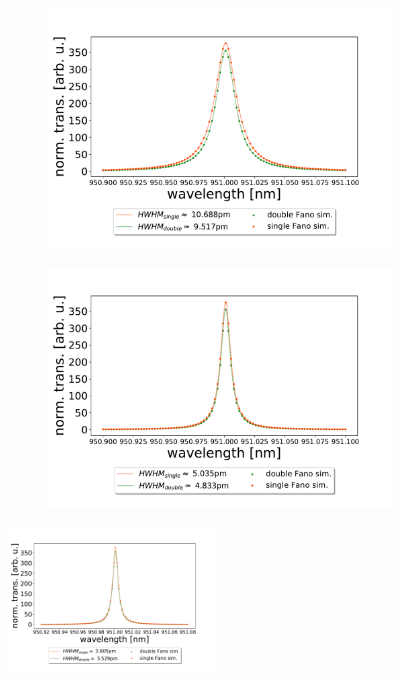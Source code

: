 \begin{figure}[h!]
    \centering
    \begin{subfigure}[b]{0.49\textwidth}
        \includegraphics[width=\textwidth]{figures/sim_single_vs_double_300um.pdf}
        \caption{}
        \label{fig:single_vs_double_simulation_300um}
    \end{subfigure}
    \begin{subfigure}[b]{0.49\textwidth}
        \includegraphics[width=\textwidth]{figures/sim_single_vs_double_700um.pdf}
        \caption{}
        \label{fig:single_vs_double_simulation_700um}
    \end{subfigure}
\end{figure}

\begin{figure}[h!]
    \centering
    \includegraphics[width=0.49\textwidth]{figures/sim_single_vs_double_1000um.pdf}
    \caption{}
    \label{fig:single_vs_double_simulation_1000um}
\end{figure}

